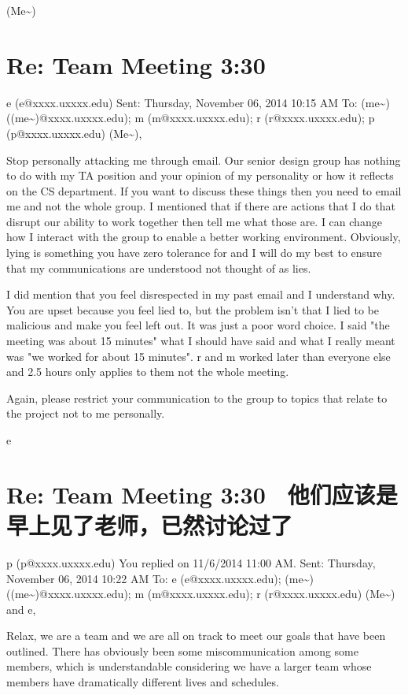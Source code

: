 \documentclass[12pt]{book}
\begin{document}
(Me\textasciitilde{})

\section{Re: Team Meeting 3:30}
\label{sec-22-3}
e (e@xxxx.uxxxx.edu)
Sent:        Thursday, November 06, 2014 10:15 AM
To:        
(me\textasciitilde{}) ((me\textasciitilde{})@xxxx.uxxxx.edu); m (m@xxxx.uxxxx.edu); r (r@xxxx.uxxxx.edu); p (p@xxxx.uxxxx.edu)
(Me\textasciitilde{}),

Stop personally attacking me through email. Our senior design group has nothing to do with my TA position and your opinion of my personality or how it reflects on the CS department. If you want to discuss these things then you need to email me and not the whole group. I mentioned that if there are actions that I do that disrupt our ability to work together then tell me what those are. I can change how I interact with the group to enable a better working environment. Obviously, lying is something you have zero tolerance for and I will do my best to ensure that my communications are understood not thought of as lies. 

I did mention that you feel disrespected in my past email and I understand why. You are upset because you feel lied to, but the problem isn't that I lied to be malicious and make you feel left out. It was just a poor word choice. I said "the meeting was about 15 minutes" what I should have said and what I really meant was "we worked for about 15 minutes". r and m worked later than everyone else and 2.5 hours only applies to them not the whole meeting. 

Again, please restrict your communication to the group to topics that relate to the project not to me personally.

e

\section{Re: Team Meeting 3:30　他们应该是早上见了老师，已然讨论过了}
\label{sec-22-4}
p (p@xxxx.uxxxx.edu)
You replied on 11/6/2014 11:00 AM.
Sent:        Thursday, November 06, 2014 10:22 AM
To:        
e (e@xxxx.uxxxx.edu); (me\textasciitilde{}) ((me\textasciitilde{})@xxxx.uxxxx.edu); m (m@xxxx.uxxxx.edu); r (r@xxxx.uxxxx.edu)
(Me\textasciitilde{}) and e,

Relax, we are a team and we are all on track to meet our goals that have been outlined. There has obviously been some miscommunication among some members, which is understandable considering we have a larger team whose members have dramatically different lives and schedules. 
\end{document}
